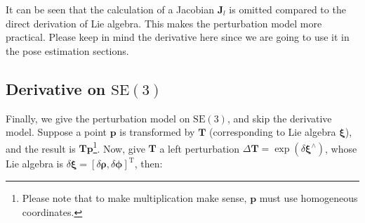 It can be seen that the calculation of a Jacobian $\mathbf{J}_l$ is omitted compared to the direct derivation of Lie algebra. This makes the perturbation model more practical. Please keep in mind the derivative here since we are going to use it in the pose estimation sections.


\subsection{Derivative on $\mathrm{SE}(3)$}
\label{sec:se3-diff}
Finally, we give the perturbation model on $\mathrm{SE}(3)$, and skip the derivative model. Suppose a point $\mathbf{p}$ is transformed by $\mathbf{T}$ (corresponding to Lie algebra $\boldsymbol{\xi}$), and the result is $\mathbf{Tp}$\footnote{Please note that to make multiplication make sense, $\mathbf{p}$ must use homogeneous coordinates. }. Now, give $\mathbf{T}$ a left perturbation $\Delta \mathbf{T} = \exp \left( \delta \boldsymbol{\xi}^\wedge \right)$, whose Lie algebra is $\delta \boldsymbol{\xi} = [\delta \boldsymbol{\rho}, \delta \boldsymbol{\phi}]^\mathrm{T}$, then:

